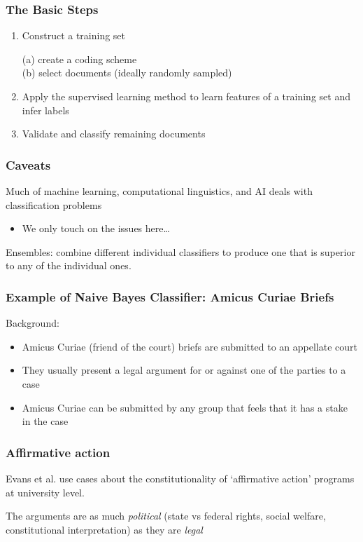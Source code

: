 \documentclass[11pt,compress,professionalfonts]{beamer}
\newcommand{\ita}{\begin{itemize}}
\newcommand{\itm}{\item[]}
\newcommand{\itz}{\end{itemize}}
\begin{document}
\begin{frame}[t,fragile]\frametitle{The Basic Steps}

\begin{enumerate}

\item Construct a training set

(a) create a coding scheme\\
(b) select documents (ideally randomly sampled)

\item Apply the supervised learning method to learn features of a training set and infer labels

\item Validate and classify remaining documents

\end{enumerate}

\end{frame}
\begin{frame}[t,fragile]\frametitle{Caveats}

Much of machine learning, computational linguistics, and AI deals with classification problems
\ita
\itm We only touch on the issues here\ldots
\itz

Ensembles: combine different individual classifiers to produce one that is superior to any of the individual ones.


\end{frame}
\begin{frame}[t,fragile]\frametitle{Example of Naive Bayes Classifier: Amicus Curiae Briefs}

Background:
\ita
\itm Amicus Curiae (friend of the court) briefs are submitted to an appellate court
\itm They usually present a legal argument for or against one of the parties to a case
\itm Amicus Curiae can be submitted by any group that feels that it has a stake in the case
\itz

\end{frame}
\begin{frame}[t,fragile]\frametitle{Affirmative action}

Evans et al. use cases about the constitutionality of `affirmative action' programs at university level.

The arguments are as much \textsl{political} (state vs federal rights, social welfare, constitutional interpretation) as they are \textsl{legal}

\end{frame}
\end{document}
